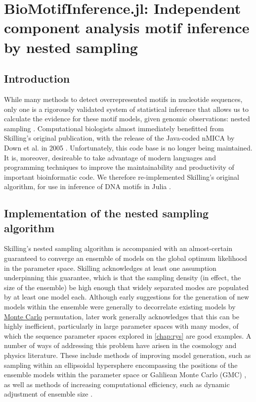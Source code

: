 \chapter{BioMotifInference.jl: Independent component analysis motif inference by nested sampling}
\label{chap:BMI}
\section{Introduction}
While many methods to detect overrepresented motifs in nucleotide sequences, only one is a rigorously validated system of statistical inference that allows us to calculate the evidence for these motif models, given genomic observations: nested sampling \cite{Skilling2006}. Computational biologists almost immediately benefitted from Skilling's original publication, with the release of the Java-coded nMICA by Down et al. in 2005 \cite{Down2005}. Unfortunately, this code base is no longer being maintained. It is, moreover, desireable to take advantage of modern languages and programming techniques to improve the maintainability and productivity of important bioinformatic code. We therefore re-implemented Skilling's original algorithm, for use in inference of DNA motifs in Julia \cite{Bezanson2015}.

\section{Implementation of the nested sampling algorithm}

Skilling's nested sampling algorithm is accompanied with an almost-certain guaranteed to converge an ensemble of models on the global optimum likelihood in the parameter space\cite{Skilling2006}. Skilling acknowledges at least one assumption underpinning this guarantee, which is that the sampling density (in effect, the size of the ensemble) be high enough that widely separated modes are populated by at least one model each. Although early suggestions for the generation of new models within the ensemble were generally to decorrelate existing models by \hyperref[ssec:MonteCarlo]{Monte Carlo} permutation, later work generally acknowledges that this can be highly inefficient, particularly in large parameter spaces with many modes, of which the sequence parameter spaces explored in \autoref{chap:rys} are good examples. A number of ways of addressing this problem have arisen in the cosmology and physics literature. These include methods of improving model generation, such as sampling within an ellipsoidal hypersphere encompassing the positions of the ensemble models within the parameter space \cite{Feroz2008,Feroz2009} or Galiliean Monte Carlo (GMC) \cite{Skilling2012}, as well as methods of increasing computational efficiency, such as dynamic adjustment of ensemble size \cite{Higson2019}. 

